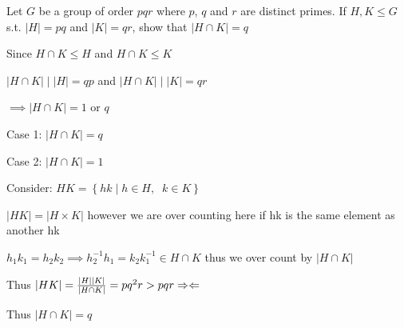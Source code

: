 \begin{example}
   Let $G$ be a group of order $pqr$ where $p$, $q$ and $r$ are distinct
   primes. If $H,K \leq G$ s.t. $|H|=pq$ and $|K|=qr$,
   show that $|H \cap K|=q$

   Since $H \cap K \leq H$ and $H \cap K \leq K$

   $|H \cap K| \mid |H|=qp$ and $|H \cap K| \mid |K|=qr$

   $\implies |H \cap K| = 1$ or $q$

   Case 1: $|H \cap K|=q$

   Case 2: $|H \cap K|=1$

   Consider: $HK=\left\{ hk \mid h \in H,\;\; k \in K \right\}$

   $|HK|=|H \times K|$ however we are over counting here if hk is the same element as another hk

   $h_1k_1=h_2k_2 \implies h_2^{-1}h_1=k_2k_1^{-1} \in H \cap K$ thus we over count by $|H \cap K|$

   Thus $|HK|=\frac{|H||K|}{|H \cap K|}=pq^2r > pqr \Rightarrow \Leftarrow$

   Thus $|H \cap K|=q$
\end{example}